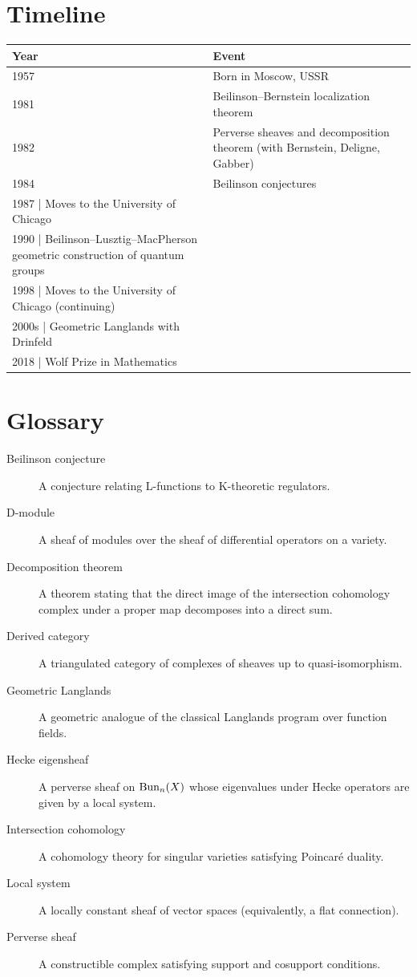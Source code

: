 \section*{Timeline}

\begin{tabularx}{\linewidth}{|p{1.5cm}|>{\raggedright\arraybackslash}X|}
\hline
\textbf{Year} & \textbf{Event} \\ \hline
1957 & Born in Moscow, USSR \\ \hline
1981 & Beilinson--Bernstein localization theorem \\ \hline
1982 & Perverse sheaves and decomposition theorem (with Bernstein, Deligne, Gabber) \\ \hline
1984 & Beilinson conjectures \\ \hline
1987 | Moves to the University of Chicago \\ \hline
1990 | Beilinson--Lusztig--MacPherson geometric construction of quantum groups \\ \hline
1998 | Moves to the University of Chicago (continuing) \\ \hline
2000s | Geometric Langlands with Drinfeld \\ \hline
2018 | Wolf Prize in Mathematics \\ \hline
\end{tabularx}

\section*{Glossary}

\begin{description}
    \item[Beilinson conjecture] A conjecture relating L-functions to K-theoretic regulators.
    \item[D-module] A sheaf of modules over the sheaf of differential operators on a variety.
    \item[Decomposition theorem] A theorem stating that the direct image of the intersection cohomology complex under a proper map decomposes into a direct sum.
    \item[Derived category] A triangulated category of complexes of sheaves up to quasi-isomorphism.
    \item[Geometric Langlands] A geometric analogue of the classical Langlands program over function fields.
    \item[Hecke eigensheaf] A perverse sheaf on $\operatorname{Bun}_n(X)$ whose eigenvalues under Hecke operators are given by a local system.
    \item[Intersection cohomology] A cohomology theory for singular varieties satisfying Poincar\'e duality.
    \item[Local system] A locally constant sheaf of vector spaces (equivalently, a flat connection).
    \item[Perverse sheaf] A constructible complex satisfying support and cosupport conditions.
\end{description}

